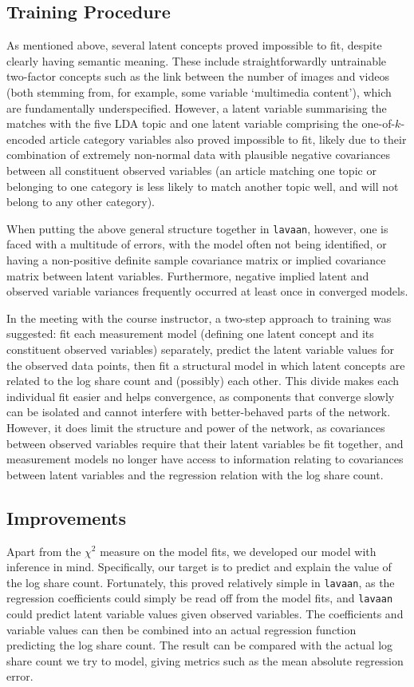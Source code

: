 \documentclass{article}
\begin{document}
\subsection{Training Procedure}
\label{sec:training}
As mentioned above, several latent concepts proved impossible to fit, despite clearly having semantic meaning. These include straightforwardly untrainable two-factor concepts such as the link between the number of images and videos (both stemming from, for example, some variable `multimedia content'), which are fundamentally underspecified. However, a latent variable summarising the matches with the five LDA topic and one latent variable comprising the one-of-$k$-encoded article category variables also proved impossible to fit, likely due to their combination of extremely non-normal data with plausible negative covariances between all constituent observed variables (an article matching one topic or belonging to one category is less likely to match another topic well, and will not belong to any other category).

When putting the above general structure together in \texttt{lavaan}, however, one is faced with a multitude of errors, with the model often not being identified, or having a non-positive definite sample covariance matrix or implied covariance matrix between latent variables. Furthermore, negative implied latent and observed variable variances frequently occurred at least once in converged models. 

In the meeting with the course instructor, a two-step approach to training was suggested: fit each measurement model (defining one latent concept and its constituent observed variables) separately, predict the latent variable values for the observed data points, then fit a structural model in which latent concepts are related to the log share count and (possibly) each other. This divide makes each individual fit easier and helps convergence, as components that converge slowly can be isolated and cannot interfere with better-behaved parts of the network. However, it does limit the structure and power of the network, as covariances between observed variables require that their latent variables be fit together, and measurement models no longer have access to information relating to covariances between latent variables and the regression relation with the log share count.

\subsection{Improvements}
Apart from the $\chi^2$ measure on the model fits, we developed our model with inference in mind. Specifically, our target is to predict and explain the value of the log share count. Fortunately, this proved relatively simple in \texttt{lavaan}, as the regression coefficients could simply be read off from the model fits, and \texttt{lavaan} could predict latent variable values given observed variables. The coefficients and variable values can then be combined into an actual regression function predicting the log share count. The result can be compared with the actual log share count we try to model, giving metrics such as the mean absolute regression error.
\end{document}
